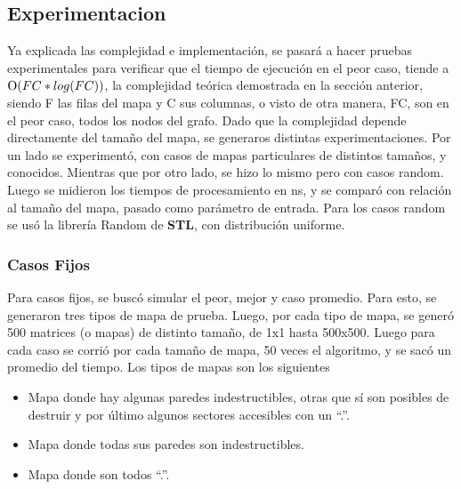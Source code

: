 
    \subsection{Experimentacion}
         

    Ya explicada las complejidad e implementación, se pasará a hacer pruebas experimentales para verificar que el tiempo de ejecución en el peor caso, tiende a $\operatorname{O}(FC*log(FC))$, la complejidad teórica demostrada en la sección anterior, siendo F las filas del mapa y C sus columnas, o visto de otra manera, FC, son en el peor caso, todos los nodos del grafo. Dado que la complejidad depende directamente del tamaño del mapa, se generaros distintas experimentaciones. Por un lado se experimentó, con casos de mapas particulares de distintos tamaños, y conocidos. Mientras que por otro lado, se hizo lo mismo pero con casos random. Luego se midieron los tiempos de procesamiento en ns, y se comparó con relación al tamaño del mapa, pasado como parámetro de entrada. Para los casos random se usó la librería Random de \textbf{STL}, con distribución uniforme. \par

    \subsubsection{Casos Fijos}

    Para casos fijos, se buscó simular el peor, mejor y caso promedio. Para esto, se generaron tres tipos de mapa de prueba. Luego, por cada tipo de mapa, se generó 500 matrices (o mapas) de distinto tamaño, de 1x1 hasta 500x500. Luego para cada caso se corrió por cada tamaño de mapa, 50 veces el algoritmo, y se sacó un promedio del tiempo. Los tipos de mapas son los siguientes

    \begin{itemize}
    	\item Mapa donde hay algunas paredes indestructibles, otras que sí son posibles de destruir y por último algunos sectores accesibles con un “.”.
    	\item Mapa donde todas sus paredes son indestructibles.
    	\item Mapa donde son todos “.”.
    \end{itemize}


